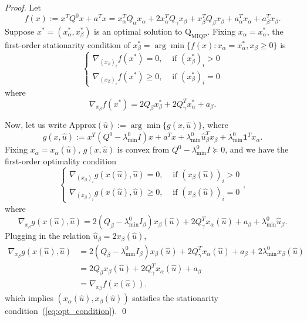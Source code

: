 \documentclass[]{article}
\begin{document}
\begin{proof}
    Let
    \[f(x) := x^TQ^0x + a^Tx = x_\alpha^T Q_\alpha x_\alpha + 2x_\alpha^T Q_\gamma x_\beta + x_\beta^T Q_\beta x_\beta + a_\alpha^Tx_\alpha+a_\beta^Tx_\beta.\]
    Suppose $x^*=(x^*_\alpha,x^*_\beta)$ is an optimal solution to $\mathrm{Q}_{\mathrm{MIQP}}$. Fixing $x_\alpha = x_\alpha^*$, the first-order stationarity condition of $x_\beta^* = \arg\min\{f(x):x_\alpha = x_\alpha^*, x_\beta\geq 0\}$ is
    \begin{equation}\label{eq:opt_condition}
        \left\{\begin{aligned}
        \nabla_{(x_\beta)_i} f(x^*) = 0, &\mbox{ if } (x_\beta^*)_i> 0\\
        \nabla_{(x_\beta)_i} f(x^*) \geq 0, &\mbox{ if } (x_\beta^*)_i= 0
    \end{aligned} \right.
    \end{equation}
    where
    \begin{equation*}
       \nabla_{x_\beta} f(x^*) =  2Q_\beta x^*_\beta + 2Q_\gamma^T x_\alpha^* +a_\beta.
    \end{equation*}

    Now, let us write $\mbox{Approx}(\hat{u}):=\arg\min\{g(x, \hat{u})\}$, where \[g(x, \hat{u}):=x^T(Q^0-\lambda_{\min}^0 I)x+a^Tx+\lambda^0_{\min}\hat{u}_\beta^Tx_\beta + \lambda_{\min}^0\mathbf{1}^T x_\alpha.\] Fixing $x_{\alpha} = x_\alpha(\hat{u})$, $g(x,\hat{u})$ is convex from $Q^0-\lambda_{\min}^0 I \succeq 0$, and we have the first-order optimality condition
    \[\left\{\begin{aligned}
        \nabla_{(x_\beta)_i} g(x(\hat{u}), \hat{u}) = 0, &\mbox{ if } (x_\beta(\hat{u}))_i> 0\\
        \nabla_{(x_\beta)_i} g(x(\hat{u}), \hat{u}) \geq 0, &\mbox{ if } (x_\beta(\hat{u}))_i= 0
    \end{aligned} \right.,\]
    where
    \[\nabla_{x_\beta}g(x(\hat{u}), \hat{u}) = 2(Q_\beta-\lambda_{\min}^0 I_\beta)x_\beta(\hat{u}) + 2Q_\gamma^T x_\alpha(\hat{u}) + a_\beta +\lambda_{\min}^0\hat{u}_\beta.\]
    Plugging in the relation $\hat{u}_\beta=2x_\beta(\hat{u})$,
    \begin{equation*}
        \begin{aligned}
            \nabla_{x_\beta}g(x(\hat{u}), \hat{u}) &= 2(Q_\beta-\lambda_{\min}^0 I_\beta)x_\beta(\hat{u}) +2Q_\gamma^T x_\alpha(\hat{u}) + a_\beta +2\lambda_{\min}^0 x_\beta(\hat{u})\\
            &=2Q_\beta x_\beta(\hat{u})+2Q_\gamma^T x_\alpha(\hat{u}) + a_\beta\\
            &=\nabla_{x_\beta} f(x(\hat{u})).
        \end{aligned}
    \end{equation*}
    which implies $(x_\alpha(\hat{u}), x_\beta(\hat{u}))$ satisfies the stationarity condition~(\ref{eq:opt_condition}).
    \qed
\end{proof}
\end{document}
